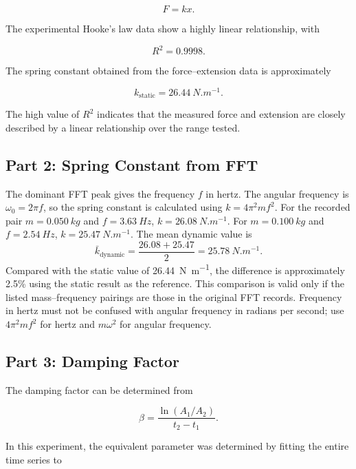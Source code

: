 \documentclass[12pt,a4paper]{article}
\begin{document}
\begin{equation}
F=kx.
\end{equation}

The experimental Hooke's law data show a highly linear relationship, with

\begin{equation}
R^2=0.9998.
\end{equation}

The spring constant obtained from the force--extension data is approximately

\begin{equation}
\boxed{
k_{\mathrm{static}} = 26.44\ \si{N.m^{-1}}
}.
\end{equation}

The high value of $R^2$ indicates that the measured force and extension are closely described by a linear relationship over the range tested.

\subsection{Part 2: Spring Constant from FFT}

The dominant FFT peak gives the frequency $f$ in hertz. The angular frequency is $\omega_0=2\pi f$, so the spring constant is calculated using $k=4\pi^2mf^2$. For the recorded pair $m=\SI{0.050}{kg}$ and $f=\SI{3.63}{Hz}$, $k=\SI{26.08}{N.m^{-1}}$. For $m=\SI{0.100}{kg}$ and $f=\SI{2.54}{Hz}$, $k=\SI{25.47}{N.m^{-1}}$. The mean dynamic value is
\[
\bar{k}_{\mathrm{dynamic}}=\frac{26.08+25.47}{2}=\SI{25.78}{N.m^{-1}}.
\]
Compared with the static value of \SI{26.44}{N.m^{-1}}, the difference is approximately 2.5\% using the static result as the reference. This comparison is valid only if the listed mass--frequency pairings are those in the original FFT records. Frequency in hertz must not be confused with angular frequency in radians per second; use $4\pi^2mf^2$ for hertz and $m\omega^2$ for angular frequency.

\subsection{Part 3: Damping Factor}

The damping factor can be determined from

\begin{equation}
\beta=
\frac{\ln(A_1/A_2)}{t_2-t_1}.
\end{equation}

In this experiment, the equivalent parameter was determined by fitting the entire time series to
\end{document}
